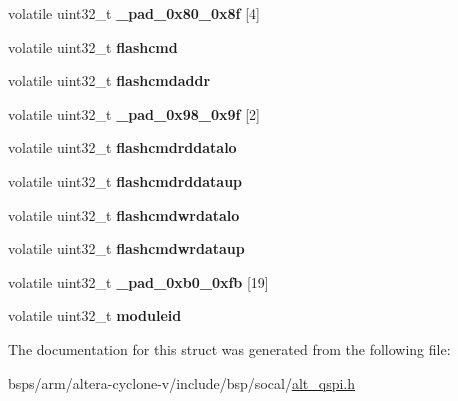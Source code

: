 \begin{DoxyCompactItemize}
volatile uint32\+\_\+t {\bfseries \+\_\+pad\+\_\+0x80\+\_\+0x8f} \mbox{[}4\mbox{]}
\item 
\mbox{\label{structALT__QSPI__raw__s_a7499d3457e0fb56c1bb42dd5a51ec824}} 
volatile uint32\+\_\+t {\bfseries flashcmd}
\item 
\mbox{\label{structALT__QSPI__raw__s_a424fc2ea351e37246752eb3c6552249b}} 
volatile uint32\+\_\+t {\bfseries flashcmdaddr}
\item 
\mbox{\label{structALT__QSPI__raw__s_a0471bade7977c2dede2e7d5212392d96}} 
volatile uint32\+\_\+t {\bfseries \+\_\+pad\+\_\+0x98\+\_\+0x9f} \mbox{[}2\mbox{]}
\item 
\mbox{\label{structALT__QSPI__raw__s_a867a2026c0c2873c33e4cade0855d0f5}} 
volatile uint32\+\_\+t {\bfseries flashcmdrddatalo}
\item 
\mbox{\label{structALT__QSPI__raw__s_a67fc4cd0c690e429550efaec46ecbdcc}} 
volatile uint32\+\_\+t {\bfseries flashcmdrddataup}
\item 
\mbox{\label{structALT__QSPI__raw__s_a9397cccdd22a06722646f1d469c19f56}} 
volatile uint32\+\_\+t {\bfseries flashcmdwrdatalo}
\item 
\mbox{\label{structALT__QSPI__raw__s_ad0cb03d649e350630621a3995be98425}} 
volatile uint32\+\_\+t {\bfseries flashcmdwrdataup}
\item 
\mbox{\label{structALT__QSPI__raw__s_a5c2a4608d77d9fd1bea684acff64fd7d}} 
volatile uint32\+\_\+t {\bfseries \+\_\+pad\+\_\+0xb0\+\_\+0xfb} \mbox{[}19\mbox{]}
\item 
\mbox{\label{structALT__QSPI__raw__s_a7729f86e84f48100ad6629f2fd2f7820}} 
volatile uint32\+\_\+t {\bfseries moduleid}
\end{DoxyCompactItemize}


The documentation for this struct was generated from the following file\+:\begin{DoxyCompactItemize}
\item 
bsps/arm/altera-\/cyclone-\/v/include/bsp/socal/\mbox{\hyperlink{include_2bsp_2socal_2alt__qspi_8h}{alt\+\_\+qspi.\+h}}\end{DoxyCompactItemize}
